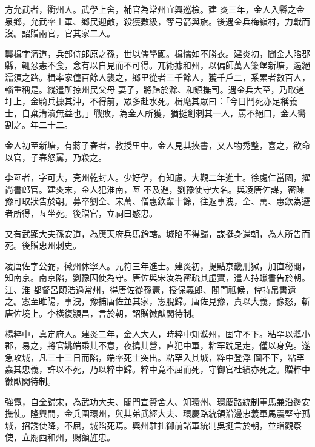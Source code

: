 \begin{pinyinscope}
 方允武者，衢州人。武學上舍，補官為常州宜興巡檢。建
 炎三年，金人入縣之金泉鄉，允武率土軍、鄉民迎敵，殺獲數級，奪弓箭與旗。後遇金兵梅嶺村，力戰而沒。詔贈兩官，官其家二人。



 龔楫字濟道，兵部侍郎原之孫，世以儒學顯。楫懦如不勝衣。建炎初，聞金人陷郡縣，輒忿恚不食，念有以自見而不可得。兀術據和州，以偏師萬人築堡新塘，遏絕濡須之路。楫率家僮百餘人襲之，鄉里從者三千餘人，獲千戶二，系累者數百人，輜重稱是。縱遣所掠州民父母
 妻子，將歸於滁、和鎮撫司。遇金兵大至，乃取道圩上，金騎兵據其沖，不得前，眾多赴水死。楫麾其眾曰：「今日鬥死亦足稱義士，自棄溝瀆無益也。」戰敗，為金人所獲，猶挺劍刺其一人，罵不絕口，金人臠割之。年二十二。



 金人初至新塘，有蔣子春者，教授里中。金人見其挾書，又人物秀整，喜之，欲命以官，子春怒罵，乃殺之。



 李亙者，字可大，兗州乾封人。少好學，有知慮。大觀二年進士。徐處仁當國，擢尚書郎官。建炎末，金人犯淮南，亙
 不及避，劉豫使守大名。與凌唐佐謀，密陳豫可取狀告於朝。募卒劉全、宋萬、僧惠欽輩十餘，往返事洩，全、萬、惠欽為邏者所得，亙坐死。後贈官，立祠曰愍忠。



 又有武顯大夫孫安道，為應天府兵馬鈐轄。城陷不得歸，謀挺身還朝，為人所告而死。後贈忠州刺史。



 凌唐佐字公弼，徽州休寧人。元符三年進士。建炎初，提點京畿刑獄，加直秘閣，知南京。南京陷，劉豫因使為守。唐佐與宋汝為密疏其虛實，遣人持蠟書告於朝。江、淮
 都督呂頤浩過常州，得唐佐從孫憲，授保義郎、閣門祗候，俾持帛書遺之。憲至睢陽，事洩，豫捕唐佐並其家，憲脫歸。唐佐見豫，責以大義，豫怒，斬唐佐境上。李橫復潁昌，言於朝，詔贈徽猷閣待制。



 楊粹中，真定府人。建炎二年，金人大入，時粹中知濮州，固守不下。粘罕以濮小郡，易之，將官姚端乘其不意，夜搗其營，直犯中軍，粘罕跣足走，僅以身免。遂急攻城，凡三十三日而陷，端率死士突出。粘罕入其城，粹中登浮
 圖不下，粘罕嘉其忠義，許以不死，乃以粹中歸。粹中竟不屈而死，守御官杜績亦死之。贈粹中徽猷閣待制。



 強霓，自金歸宋，為武功大夫、閣門宣贊舍人、知環州、環慶路統制軍馬兼沿邊安撫使。隆興間，金兵圍環州，與其弟武經大夫、環慶路統領沿邊忠義軍馬震堅守孤城，招誘使降，不屈，城陷死焉。興州駐扎御前諸軍統制吳挺言於朝，並贈觀察使，立廟西和州，賜額旌忠。




\end{pinyinscope}
